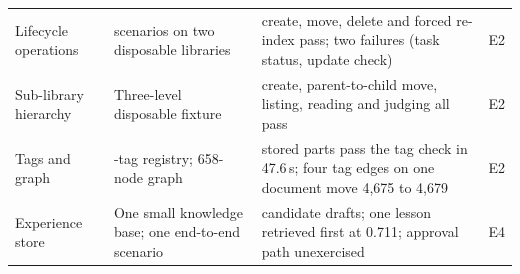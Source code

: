 \documentclass[final,5p,times,twocolumn]{elsarticle}
\begin{document}
\begin{table}[t]
\begin{tabular}{@{}>{\raggedright\arraybackslash}p{}>{\raggedright\arraybackslash}p{}>{\raggedright\arraybackslash}p{}>{\raggedright\arraybackslash}p{}@{}}
Lifecycle operations & 16 scenarios on two disposable libraries & create, move, delete and forced re-index pass; two failures (task status, update check) & E2\\
Sub-library hierarchy & Three-level disposable fixture & create, parent-to-child move, listing, reading and judging all pass & E2\\
Tags and graph & 316-tag registry; 658-node graph & 165 stored parts pass the tag check in 47.6\,s; four tag edges on one document move 4{,}675 to 4{,}679 & E2\\
Experience store & One small knowledge base; one end-to-end scenario & 13 candidate drafts; one lesson retrieved first at 0.711; approval path unexercised & E4\\
\bottomrule
\end{tabular}
\end{table}
\end{document}
